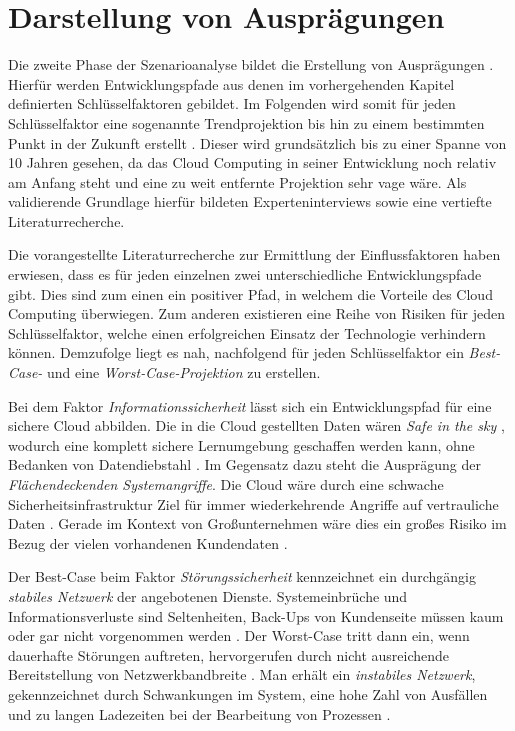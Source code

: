 \section{Darstellung von Ausprägungen}
\label{manifestations}

Die zweite Phase der Szenarioanalyse bildet die Erstellung von Ausprägungen \cite{spath}. Hierfür werden Entwicklungspfade aus denen im vorhergehenden Kapitel definierten Schlüsselfaktoren gebildet. Im Folgenden wird somit für jeden Schlüsselfaktor eine sogenannte Trendprojektion bis hin zu einem bestimmten Punkt in der Zukunft erstellt \cite{mietzner}. Dieser wird grundsätzlich bis zu einer Spanne von 10 Jahren gesehen, da das Cloud Computing in seiner Entwicklung noch relativ am Anfang steht und eine zu weit entfernte Projektion sehr vage wäre. Als validierende Grundlage hierfür bildeten Experteninterviews sowie eine vertiefte Literaturrecherche.

Die vorangestellte Literaturrecherche zur Ermittlung der Einflussfaktoren haben erwiesen, dass es für jeden einzelnen zwei unterschiedliche Entwicklungspfade gibt. Dies sind zum einen ein positiver Pfad, in welchem die Vorteile des Cloud Computing überwiegen. Zum anderen existieren eine Reihe von Risiken für jeden Schlüsselfaktor, welche einen erfolgreichen Einsatz der Technologie verhindern können. Demzufolge liegt es nah, nachfolgend für jeden Schlüsselfaktor ein \textit{Best-Case-} und eine \textit{Worst-Case-Projektion} zu erstellen.

Bei dem Faktor \textit{Informationssicherheit} lässt sich ein Entwicklungspfad für eine sichere Cloud abbilden. Die in die Cloud gestellten Daten wären \textit{Safe in the sky }\cite{almajalid}, wodurch eine komplett sichere Lernumgebung geschaffen werden kann, ohne Bedanken von Datendiebstahl \cite{meinel} \cite{renz}. Im Gegensatz dazu steht die Ausprägung der \textit{Flächendeckenden Systemangriffe}. Die Cloud wäre durch eine schwache Sicherheitsinfrastruktur Ziel für immer wiederkehrende Angriffe auf vertrauliche Daten \cite{gebauer}. Gerade im Kontext von Großunternehmen wäre dies ein großes Risiko im Bezug der vielen vorhandenen Kundendaten \cite{stute}.

Der Best-Case beim Faktor \textit{Störungssicherheit} kennzeichnet ein durchgängig \textit{stabiles Netzwerk} der angebotenen Dienste. Systemeinbrüche und Informationsverluste sind Seltenheiten, Back-Ups von Kundenseite müssen kaum oder gar nicht vorgenommen werden \cite{almajalid}. Der Worst-Case tritt dann ein, wenn dauerhafte Störungen auftreten, hervorgerufen durch nicht ausreichende Bereitstellung von Netzwerkbandbreite \cite{gebauer}. Man erhält ein \textit{instabiles Netzwerk}, gekennzeichnet durch Schwankungen im System, eine hohe Zahl von Ausfällen und zu langen Ladezeiten bei der Bearbeitung von Prozessen \cite{gebauer}.

